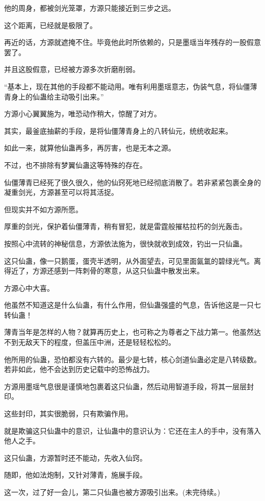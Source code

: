 \begin{this_body}
他的周身，都被剑光笼罩，方源只能接近到三步之远。

这个距离，已经就是极限了。

再近的话，方源就遮掩不住。毕竟他此时所依赖的，只是墨瑶当年残存的一股假意罢了。

并且这股假意，已经被方源多次折磨削弱。

“基本上，现在其他的手段都不能动用。唯有利用墨瑶意志，伪装气息，将仙僵薄青身上的仙蛊给主动吸引出来。”

方源小心翼翼施为，唯恐动作稍大，惊醒了对方。

其实，最釜底抽薪的手段，是将仙僵薄青身上的八转仙元，统统收起来。

如此一来，就算他仙蛊再多，再厉害，也是无本之源。

不过，也不排除有梦翼仙蛊这等特殊的存在。

仙僵薄青已经死了很久很久，他的仙窍死地已经彻底消散了。若非紧紧包裹全身的凝重剑光，方源甚至可以将其活捉。

但现实并不如方源所愿。

厚重的剑光，保护着仙僵薄青，稍有冒犯，就是雷霆般摧枯拉朽的剑光轰击。

按照心中流转的神秘信息，方源依法施为，很快就收到成效，钓出一只仙蛊。

这只仙蛊，像一只鹅蛋，蛋壳半透明，从外面望去，可见里面氤氲的碧绿光气。离得近了，方源还感到一阵刺骨的寒意，从这只仙蛊中散发出来。

方源心中大喜。

他虽然不知道这是什么仙蛊，有什么作用，但仙蛊强盛的气息，告诉他这是一只七转仙蛊！

薄青当年是怎样的人物？就算再历史上，也可称之为尊者之下战力第一。他虽然达不到无敌天下的程度，但盖压中洲，还是轻轻松松的。

他所用的仙蛊，恐怕都没有六转的。最少是七转，核心剑道仙蛊必定是八转级数。若非如此，他不会达到历史记载中的恐怖战力。

方源用墨瑶气息很是谨慎地包裹着这只仙蛊，然后动用智道手段，将其一层层封印。

这些封印，其实很脆弱，只有欺骗作用。

就是欺骗这只仙蛊中的意识，让仙蛊中的意识认为：它还在主人的手中，没有落入他人之手。

这只仙蛊，方源暂时还不能动，先收入仙窍。

随即，他如法炮制，又针对薄青，施展手段。

这一次，过了好一会儿，第二只仙蛊也被方源吸引出来。(未完待续。)

\end{this_body}

